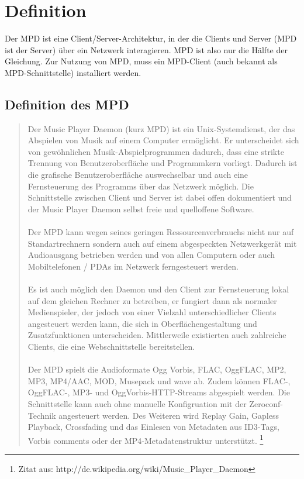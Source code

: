 \chapter{Definition}
Der MPD ist eine Client/Server-Architektur, in der die Clients und Server (MPD ist der Server)
über ein Netzwerk interagieren. MPD ist also nur die Hälfte der Gleichung. Zur Nutzung von 
MPD, muss ein MPD-Client (auch bekannt als MPD-Schnittstelle) installiert werden.
\section{Definition des MPD}
\begin{quote}
Der Music Player Daemon (kurz MPD) ist ein Unix-Systemdienst, der das Abspielen von Musik auf 
einem Computer ermöglicht. Er unterscheidet sich von gewöhnlichen Musik-Abspielprogrammen dadurch, 
dass eine strikte Trennung von Benutzeroberfläche und Programmkern vorliegt. Dadurch ist die 
grafische Benutzeroberfläche auswechselbar und auch eine Fernsteuerung des Programms über das 
Netzwerk möglich. Die Schnittstelle zwischen Client und Server ist dabei offen dokumentiert und 
der Music Player Daemon selbst freie und quelloffene Software.\ \\ \\
Der MPD kann wegen seines geringen Ressourcenverbrauchs nicht nur auf Standartrechnern sondern 
auch auf einem abgespeckten Netzwerkgerät mit Audioausgang betrieben werden und von allen Computern
oder auch Mobiltelefonen / PDAs im Netzwerk ferngesteuert werden.\ \\ \\
Es ist auch möglich den Daemon und den Client zur Fernsteuerung lokal auf dem gleichen Rechner
zu betreiben, er fungiert dann als normaler Medienspieler, der jedoch von einer Vielzahl 
unterschiedlicher Clients angesteuert werden kann, die sich in Oberflächengestaltung und Zusatzfunktionen
unterscheiden. Mittlerweile existierten auch zahlreiche Clients, die eine Webschnittstelle bereitstellen.\ \\ \\
Der MPD spielt die Audioformate Ogg Vorbis, FLAC, OggFLAC, MP2, MP3, MP4/AAC, MOD, Musepack und wave ab.
Zudem können FLAC-, OggFLAC-, MP3- und OggVorbis-HTTP-Streams abgespielt werden. Die Schnittstelle kann
auch ohne manuelle Konfigruation mit der Zeroconf-Technik angesteuert werden. Des Weiteren wird Replay
Gain, Gapless Playback, Crossfading und das Einlesen von Metadaten aus ID3-Tags, Vorbis comments oder
der MP4-Metadatenstruktur unterstützt.
\footnote{Zitat aus: http://de.wikipedia.org/wiki/Music\_Player\_Daemon}
\end{quote}
\newpage
